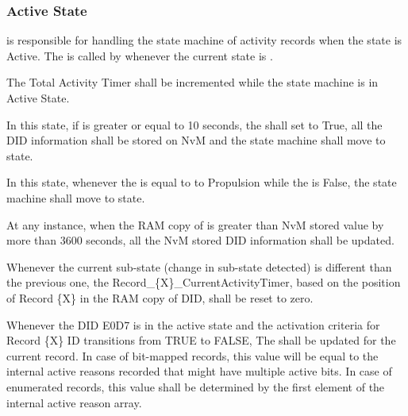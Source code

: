 \subsubsection{Active State}
\label{subsec:active_state}

{ is responsible for handling the state machine of activity records when the state is Active. 
The  is called by  whenever the current state is .}
{}

{The Total Activity Timer  shall be incremented while the state machine is in Active State.}
{}

{In this state, if  is greater or equal to 10 seconds,
the  shall set to True, all the DID information shall be stored on NvM and the state machine shall move to  state.}
{   }

{In this state, whenever the  is equal to to Propulsion while the  is False, the state machine shall move to  state.}
{}

{At any instance, when the RAM copy of  is greater than NvM stored value by more than 3600 seconds, all the NvM stored DID information shall be updated.}
{  }

{Whenever the current sub-state (change in sub-state detected) is different than the previous one, the Record_\{X\}_CurrentActivityTimer, based on the position of Record \{X\} in the RAM copy of DID, shall be reset to zero.}
{}

{Whenever the DID E0D7 is in the active state and the activation criteria for Record \{X\} ID transitions from TRUE to FALSE,
The  shall be updated for the current record. In case of bit-mapped records, this value will be equal to the internal active reasons recorded that might have multiple active bits.
In case of enumerated records, this value shall be determined by the first element of the internal active reason array.
}
{}

